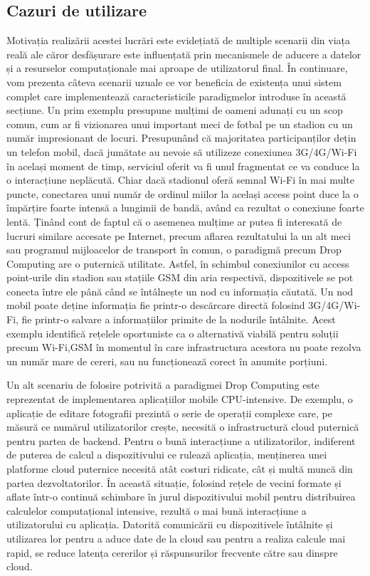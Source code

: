 \documentclass[12pt,a4paper]{report}
\begin{document}
\subsection{Cazuri de utilizare}
Motivația realizării acestei lucrări este evidețiată de multiple scenarii din viața reală ale căror desfășurare este influențată prin mecanismele de aducere a datelor și a resurselor computaționale mai aproape de utilizatorul final. În continuare, vom prezenta câteva scenarii uzuale ce vor beneficia de existența unui sistem complet care implementează caracteristicile paradigmelor introduse în această secțiune. Un prim exemplu presupune mulțimi de oameni adunați cu un scop comun, cum ar fi vizionarea unui important meci de fotbal pe un stadion cu un număr impresionant de locuri. Presupunând că majoritatea participanților dețin un telefon mobil, dacă jumătate au nevoie să utilizeze conexiunea 3G/4G/Wi-Fi în același moment de timp, serviciul oferit va fi unul fragmentat ce va conduce la o interacțiune neplăcută. Chiar dacă stadionul oferă semnal Wi-Fi în mai multe puncte, conectarea unui număr de ordinul miilor la același access point duce la o împărțire foarte intensă a lungimii de bandă, având ca rezultat o conexiune foarte lentă. Ținând cont de faptul că o asemenea mulțime ar putea fi interesată de lucruri similare accesate pe Internet, precum aflarea rezultatului la un alt meci sau programul mijloacelor de transport în comun, o paradigmă precum Drop Computing are o puternică utilitate. Astfel, în schimbul conexiunilor cu access point-urile din stadion sau stațiile GSM din aria respectivă, dispozitivele se pot conecta între ele până când se întâlnește un nod cu informația căutată. Un nod mobil poate deține informația fie printr-o descărcare directă folosind 3G/4G/Wi-Fi, fie printr-o salvare a informațiilor primite de la nodurile întâlnite. Acest exemplu identifică rețelele oportuniste ca o alternativă viabilă pentru soluții precum Wi-Fi,GSM în momentul în care infrastructura acestora nu poate rezolva un număr mare de cereri, sau nu funcționează corect în anumite porțiuni.

Un alt scenariu de folosire potrivită a paradigmei Drop Computing este reprezentat de implementarea aplicațiilor mobile CPU-intensive. De exemplu, o aplicație de editare fotografii prezintă o serie de operații complexe care, pe măsură ce numărul utilizatorilor crește, necesită o infrastructură cloud puternică pentru partea de backend. Pentru o bună interacțiune a utilizatorilor, indiferent de puterea de calcul a dispozitivului ce rulează aplicația, menținerea unei platforme cloud puternice necesită atât costuri ridicate, cât și multă muncă din partea dezvoltatorilor. În această situație, folosind rețele de vecini formate și aflate într-o continuă schimbare în jurul dispozitivului mobil pentru distribuirea calculelor computațional intensive, rezultă o mai bună interacțiune a utilizatorului cu aplicația. Datorită comunicării cu dispozitivele întâlnite și utilizarea lor pentru a aduce date de la cloud sau pentru a realiza calcule mai rapid, se reduce latența cererilor și răspunsurilor frecvente către sau dinspre cloud.
\end{document}
